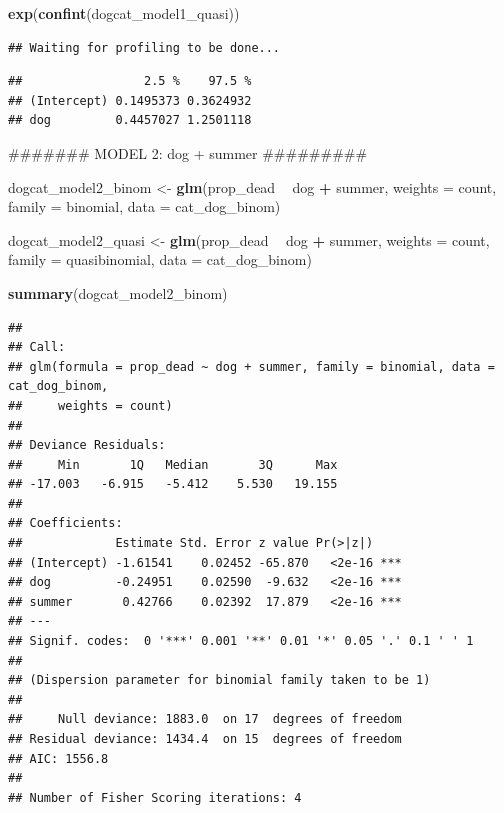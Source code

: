 \documentclass[]{article}
\newenvironment{Shaded}{\begin{snugshade}}{\end{snugshade}}
\newcommand{\KeywordTok}[1]{\textcolor[rgb]{0.13,0.29,0.53}{\textbf{#1}}}
\newcommand{\DataTypeTok}[1]{\textcolor[rgb]{0.13,0.29,0.53}{#1}}
\newcommand{\StringTok}[1]{\textcolor[rgb]{0.31,0.60,0.02}{#1}}
\newcommand{\OperatorTok}[1]{\textcolor[rgb]{0.81,0.36,0.00}{\textbf{#1}}}
\newcommand{\NormalTok}[1]{#1}
\begin{document}
\begin{Shaded}
\begin{Highlighting}[]
\KeywordTok{exp}\NormalTok{(}\KeywordTok{confint}\NormalTok{(dogcat_model1_quasi))}
\end{Highlighting}
\end{Shaded}

\begin{verbatim}
## Waiting for profiling to be done...
\end{verbatim}

\begin{verbatim}
##                 2.5 %    97.5 %
## (Intercept) 0.1495373 0.3624932
## dog         0.4457027 1.2501118
\end{verbatim}

\begin{Shaded}
\begin{Highlighting}[]
\NormalTok{####### MODEL 2: dog + summer #########}

\NormalTok{dogcat_model2_binom <-}\StringTok{ }\KeywordTok{glm}\NormalTok{(prop_dead }\OperatorTok{~}\StringTok{ }\NormalTok{dog }\OperatorTok{+}\StringTok{ }\NormalTok{summer, }\DataTypeTok{weights =}\NormalTok{ count, }\DataTypeTok{family =}\NormalTok{ binomial, }\DataTypeTok{data =}\NormalTok{ cat_dog_binom)}

\NormalTok{dogcat_model2_quasi <-}\StringTok{ }\KeywordTok{glm}\NormalTok{(prop_dead }\OperatorTok{~}\StringTok{ }\NormalTok{dog }\OperatorTok{+}\StringTok{ }\NormalTok{summer, }\DataTypeTok{weights =}\NormalTok{ count, }\DataTypeTok{family =}\NormalTok{ quasibinomial, }\DataTypeTok{data =}\NormalTok{ cat_dog_binom)}

\KeywordTok{summary}\NormalTok{(dogcat_model2_binom)}
\end{Highlighting}
\end{Shaded}

\begin{verbatim}
## 
## Call:
## glm(formula = prop_dead ~ dog + summer, family = binomial, data = cat_dog_binom, 
##     weights = count)
## 
## Deviance Residuals: 
##     Min       1Q   Median       3Q      Max  
## -17.003   -6.915   -5.412    5.530   19.155  
## 
## Coefficients:
##             Estimate Std. Error z value Pr(>|z|)    
## (Intercept) -1.61541    0.02452 -65.870   <2e-16 ***
## dog         -0.24951    0.02590  -9.632   <2e-16 ***
## summer       0.42766    0.02392  17.879   <2e-16 ***
## ---
## Signif. codes:  0 '***' 0.001 '**' 0.01 '*' 0.05 '.' 0.1 ' ' 1
## 
## (Dispersion parameter for binomial family taken to be 1)
## 
##     Null deviance: 1883.0  on 17  degrees of freedom
## Residual deviance: 1434.4  on 15  degrees of freedom
## AIC: 1556.8
## 
## Number of Fisher Scoring iterations: 4
\end{verbatim}
\end{document}
